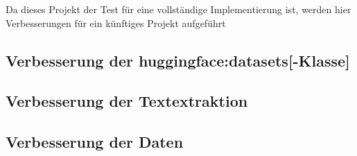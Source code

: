 Da dieses Projekt der Test für eine vollständige Implementierung ist,
werden hier Verbesserungen für ein künftiges Projekt aufgeführt

\subsection{Verbesserung der \gls{huggingface:datasets}[-Klasse]}


\subsection{Verbesserung der Textextraktion}


\subsection{Verbesserung der Daten}

